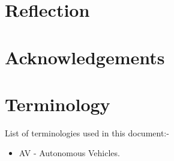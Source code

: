 \documentclass[12pt]{report} %
\begin{document}
\chapter{Reflection}

\chapter*{Acknowledgements}

\chapter*{Terminology}
List of terminologies used in this document:-
\begin{itemize}
	\item AV - Autonomous Vehicles.
\end{itemize}


\clearpage
\nocite{*}
\small{
	}


\end{document}
